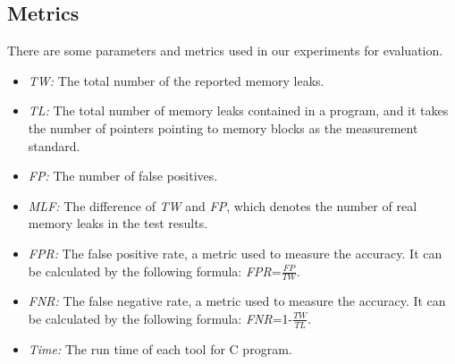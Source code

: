 \subsection{Metrics}\label{ssec:m}
There are some parameters and metrics used in our experiments for evaluation.
\begin{itemize}
\item \textit{TW:} The total number of the reported memory leaks.
\item \textit{TL:} The total number of memory leaks contained in a program, and it takes the number of pointers pointing to memory blocks as the measurement standard.
\item \textit{FP:} The number of false positives.
\item \textit{MLF:} The difference of \textit{TW} and \textit{FP}, which denotes the number of real memory leaks in the test results.
\item \textit{FPR:} The false positive rate, a metric used to measure the accuracy. It can be calculated by the following formula: \textit{FPR}=$\frac{\textit{FP}}{\textit{TW}}$.
\item \textit{FNR:} The false negative rate, a metric used to measure the accuracy. It can be calculated by the following formula: \textit{FNR}=1-$\frac{\textit{TW}}{\textit{TL}}$.
\item \textit{Time:} The run time of each tool for C program.
\end{itemize}
